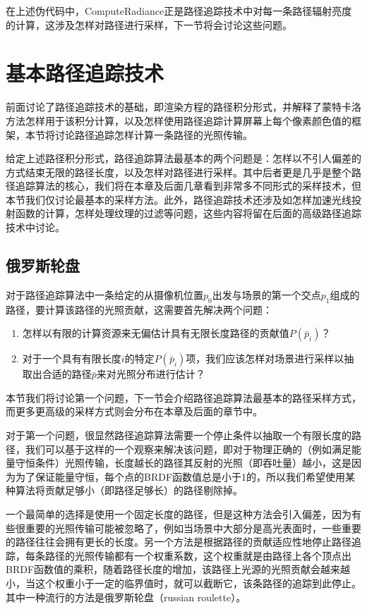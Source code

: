 在上述伪代码中，ComputeRadiance正是路径追踪技术中对每一条路径辐射亮度的计算，这涉及怎样对路径进行采样，下一节将会讨论这些问题。





\section{基本路径追踪技术}\label{sec:pt-basic}
前面讨论了路径追踪技术的基础，即渲染方程的路径积分形式，并解释了蒙特卡洛方法怎样用于该积分计算，以及怎样使用路径追踪计算屏幕上每个像素颜色值的框架，本节将讨论路径追踪怎样计算一条路径的光照传输。

给定上述路径积分形式，路径追踪算法最基本的两个问题是：怎样以不引人偏差的方式结束无限的路径长度，以及怎样对路径进行采样。其中后者更是几乎是整个路径追踪算法的核心，我们将在本章及后面几章看到非常多不同形式的采样技术，但本节我们仅讨论最基本的采样方法。此外，路径追踪技术还涉及如怎样加速光线投射函数的计算，怎样处理纹理的过滤等问题，这些内容将留在后面的高级路径追踪技术中讨论。






\subsection{俄罗斯轮盘}\label{sec:russian-roulette}
对于路径追踪算法中一条给定的从摄像机位置$p_0$出发与场景的第一个交点$p_1$组成的路径，要计算该路径的光照贡献，这需要首先解决两个问题：

\begin{enumerate}
	\item 怎样以有限的计算资源来无偏估计具有无限长度路径的贡献值$P(\bar{p}_i)$？
	\item 对于一个具有有限长度$i$的特定$P(\bar{p}_i)$项，我们应该怎样对场景进行采样以抽取出合适的路径$\bar{p}$来对光照分布进行估计？
\end{enumerate}

本节我们将讨论第一个问题，下一节会介绍路径追踪算法最基本的路径采样方式，而更多更高级的采样方式则会分布在本章及后面的章节中。

对于第一个问题，很显然路径追踪算法需要一个停止条件以抽取一个有限长度的路径，我们可以基于这样的一个观察来解决该问题，即对于物理正确的（例如满足能量守恒条件）光照传输，长度越长的路径其反射的光照（即吞吐量）越小，这是因为为了保证能量守恒，每个点的BRDF函数值总是小于1的，所以我们希望使用某种算法将贡献足够小（即路径足够长）的路径剔除掉。

一个最简单的选择是使用一个固定长度的路径，但是这种方法会引入偏差，因为有些很重要的光照传输可能被忽略了，例如当场景中大部分是高光表面时，一些重要的路径往往会拥有更长的长度。另一个方法是根据路径的贡献适应性地停止路径追踪，每条路径的光照传输都有一个权重系数，这个权重就是由路径上各个顶点出BRDF函数值的乘积，随着路径长度的增加，该路径上光源的光照贡献会越来越小，当这个权重小于一定的临界值时，就可以截断它，该条路径的追踪到此停止。其中一种流行的方法是俄罗斯轮盘（russian roulette）。

